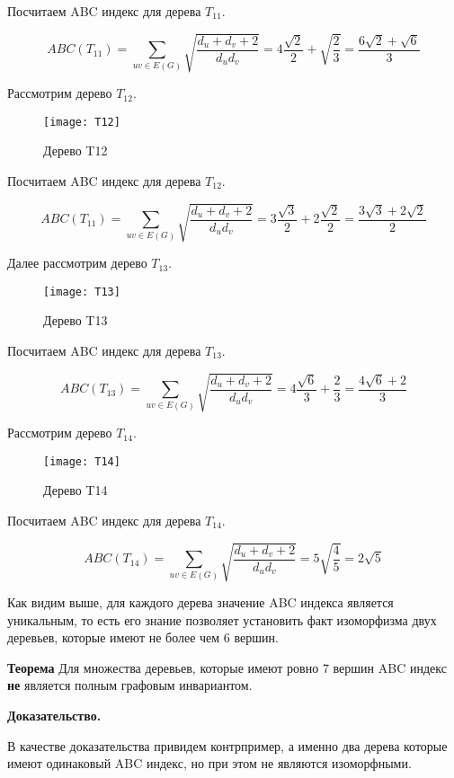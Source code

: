 \documentclass{article}
\begin{document}
Посчитаем ABC индекс для дерева $T_{11}$.

$$ ABC(T_{11}) = \sum_{uv \in E(G)} \sqrt{\frac{d_u + d_v + 2}{d_u d_v}} = 4 \frac{\sqrt{2}}{2} + \sqrt{\frac{2}{3}} = \frac{6 \sqrt{2} + \sqrt{6}}{3}$$


Рассмотрим дерево $T_{12}$.

\begin{figure}[h]
\texttt{[image: T12]}
\centering
\caption{Дерево T12}
\end{figure}

Посчитаем ABC индекс для дерева $T_{12}$.

$$ ABC(T_{11}) = \sum_{uv \in E(G)} \sqrt{\frac{d_u + d_v + 2}{d_u d_v}} = 3 \frac{\sqrt{3}}{2} + 2 \frac{\sqrt{2}}{2} = \frac{3 \sqrt{3} + 2 \sqrt{2}}{2}$$

\newpage

Далее рассмотрим дерево $T_{13}$.

\begin{figure}[h]
\texttt{[image: T13]}
\centering
\caption{Дерево T13}
\end{figure}

Посчитаем ABC индекс для дерева $T_{13}$.

$$ ABC(T_{13}) = \sum_{uv \in E(G)} \sqrt{\frac{d_u + d_v + 2}{d_u d_v}} = 4 \frac{\sqrt{6}}{3} + \frac{2}{3} = \frac{4 \sqrt{6} + 2}{3} $$


Рассмотрим дерево $T_{14}$.

\begin{figure}[h]
\texttt{[image: T14]}
\centering
\caption{Дерево T14}
\end{figure}

Посчитаем ABC индекс для дерева $T_{14}$.

$$ ABC(T_{14}) = \sum_{uv \in E(G)} \sqrt{\frac{d_u + d_v + 2}{d_u d_v}} = 5 \sqrt{\frac{4}{5}} = 2 \sqrt{5} $$

Как видим выше, для каждого дерева значение ABC индекса является уникальным, то есть его знание позволяет установить факт изоморфизма двух деревьев, которые имеют не более чем $6$ вершин.

\bigskip

\textbf{Теорема} Для множества деревьев, которые имеют ровно 7 вершин ABC индекс \textbf{не} является полным графовым инвариантом.

\textbf{Доказательство.}

В качестве доказательства привидем контрпример, а именно два дерева которые имеют одинаковый ABC индекс, но при этом не являются изоморфными.  
\end{document}
